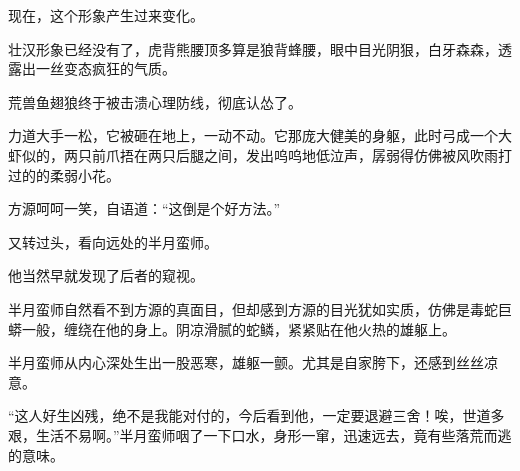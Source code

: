 \begin{this_body}
现在，这个形象产生过来变化。

壮汉形象已经没有了，虎背熊腰顶多算是狼背蜂腰，眼中目光阴狠，白牙森森，透露出一丝变态疯狂的气质。

荒兽鱼翅狼终于被击溃心理防线，彻底认怂了。

力道大手一松，它被砸在地上，一动不动。它那庞大健美的身躯，此时弓成一个大虾似的，两只前爪捂在两只后腿之间，发出呜呜地低泣声，孱弱得仿佛被风吹雨打过的的柔弱小花。

方源呵呵一笑，自语道：“这倒是个好方法。”

又转过头，看向远处的半月蛮师。

他当然早就发现了后者的窥视。

半月蛮师自然看不到方源的真面目，但却感到方源的目光犹如实质，仿佛是毒蛇巨蟒一般，缠绕在他的身上。阴凉滑腻的蛇鳞，紧紧贴在他火热的雄躯上。

半月蛮师从内心深处生出一股恶寒，雄躯一颤。尤其是自家胯下，还感到丝丝凉意。

“这人好生凶残，绝不是我能对付的，今后看到他，一定要退避三舍！唉，世道多艰，生活不易啊。”半月蛮师咽了一下口水，身形一窜，迅速远去，竟有些落荒而逃的意味。

\end{this_body}

